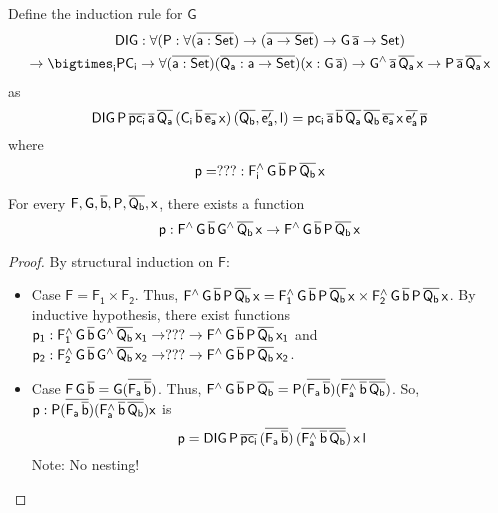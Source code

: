 \documentclass[acmsmall,screen,review,anonymous]{acmart}
\theoremstyle{definition}
\begin{document}
Define the induction rule for $\mathsf{G}$
\begin{multline}
\mathsf{DIG : \forall (P : \forall (\ol{a : Set}) \to (\ol{a \to Set}) \to G\,\ol{a} \to Set)} \\
\mathsf{\to \bigtimes_i PC_i
\to \forall (\ol{a : Set})(\ol{Q_a : a \to Set})(x : G\,\ol{a}) \to G^{\wedge}\,\ol{a}\,\ol{Q_a}\,x \to P\,\ol{a}\,\ol{Q_a}\,x}
\end{multline}
as
\[
\mathsf{DIG\,P\,\overline{pc_i}\,\overline{a}\,\overline{Q_a}\,(C_i\,\overline{b}\,\overline{e_a}\,x)\,(\overline{Q_b}, \overline{e'_a}, l)
= pc_i\,\overline{a}\,\overline{b}\,\overline{Q_a}\,\overline{Q_b}\,\overline{e_a}\,x\,\overline{e'_a}\,\overline{p}}
\]
where
\[
\mathsf{p = ??? : F_i^{\wedge}\,G\,\overline{b}\,P\,\overline{Q_b}\,x}
\]

\begin{lemma}
For every $\mathsf{F, G, \overline{b}, P, \overline{Q_b}, x}$, there exists a function
\[
\mathsf{p : F^{\wedge}\,G\,\overline{b}\,G^{\wedge}\,\overline{Q_b}\,x \to F^{\wedge}\,G\,\overline{b}\,P\,\overline{Q_b}\,x}
\]
\end{lemma}
\begin{proof}
By structural induction on $\mathsf{F}$:
\begin{itemize}
\item Case $\mathsf{F = F_1 \times F_2}$.
Thus, $\mathsf{F^{\wedge}\,G\,\overline{b}\,P\,\overline{Q_b}\,x = F_1^{\wedge}\,G\,\overline{b}\,P\,\overline{Q_b}\,x \times F_2^{\wedge}\,G\,\overline{b}\,P\,\overline{Q_b}\,x}$.
By inductive hypothesis, there exist functions
$\mathsf{p_1 : F_1^{\wedge}\,G\,\overline{b}\,G^{\wedge}\,\overline{Q_b}\,x_1 \to ??? \to F^{\wedge}\,G\,\overline{b}\,P\,\overline{Q_b}\,x_1}$ and
$\mathsf{p_2 : F_2^{\wedge}\,G\,\overline{b}\,G^{\wedge}\,\overline{Q_b}\,x_2 \to ??? \to F^{\wedge}\,G\,\overline{b}\,P\,\overline{Q_b}\,x_2}$.
\item Case $\mathsf{F\,G\,\overline{b} = G(\overline{F_a\,\overline{b}})}$.
Thus, $\mathsf{F^{\wedge}\,G\,\overline{b}\,P\,\overline{Q_b} = P (\overline{F_a\,\overline{b}}) (\overline{F_a^{\wedge}\,\overline{b}\,\overline{Q_b}})}$.
So, $\mathsf{p : P (\overline{F_a\,\overline{b}}) (\overline{F_a^{\wedge}\,\overline{b}\,\overline{Q_b}}) x}$ is
\[
\mathsf{p = DIG\,P\,\overline{pc_i}\,(\overline{F_a\,\overline{b}})\,(\overline{F_a^{\wedge}\,\overline{b}\,\overline{Q_b}})\,x\,l}
\]
Note: No nesting!
\end{itemize}
\end{proof}
\end{document}

